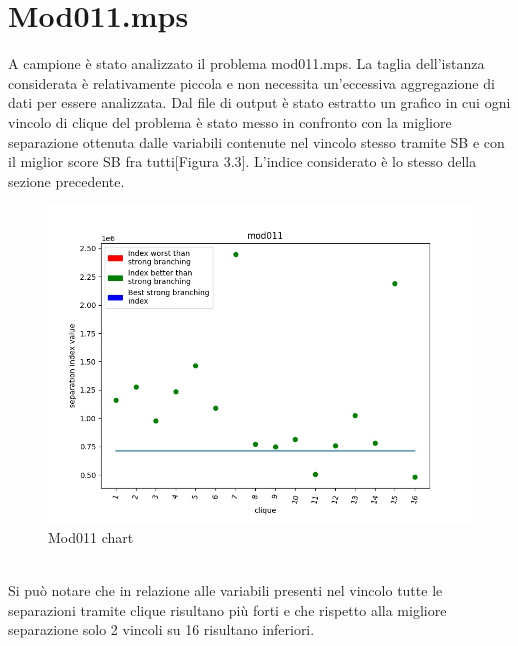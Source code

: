 \documentclass[12pt,a4paper,twoside,openright]{book}
\begin{document}
\section{Mod011.mps}
A campione è stato analizzato il problema mod011.mps. La taglia dell'istanza considerata è relativamente piccola
e non necessita un'eccessiva aggregazione di dati per essere analizzata. Dal file di output è stato estratto un grafico
in cui ogni vincolo di clique del problema è stato messo in confronto con la migliore separazione ottenuta dalle variabili
contenute nel vincolo stesso tramite SB e con il miglior score SB fra tutti[Figura 3.3]. L'indice considerato è lo stesso 
della sezione precedente.\\
\begin{figure}[ht]
    \centering
    \includegraphics [scale = 0.65]{chart_exp1_mod011}
    \caption{Mod011 chart}
    \label{fig:mod011}
\end{figure}\\
Si può notare che in relazione alle variabili presenti nel vincolo tutte le separazioni tramite clique risultano più forti 
e che rispetto alla migliore separazione solo 2 vincoli su 16 risultano inferiori. 
\\
\end{document}
